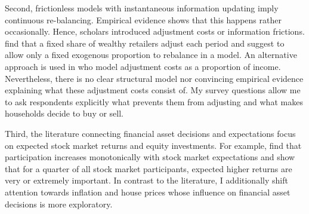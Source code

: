 \documentclass[ProjectABM]{subfiles}
\begin{document}
Second, frictionless models with instantaneous information updating imply continuous re-balancing. Empirical evidence shows that this happens rather occasionally. Hence, scholars introduced adjustment costs or information frictions. \cite{giglio_et_al_2019five} find that a fixed share of wealthy retailers adjust each period and suggest to allow only a fixed exogenous proportion to rebalance in a model. An alternative approach is used in \cite{bonaparte_et_al_2012adjustment} who model adjustment costs as a proportion of income. 
Nevertheless, there is no clear structural model nor convincing empirical evidence explaining what these adjustment costs consist of. My survey questions allow me to ask respondents explicitly what prevents them from adjusting and what makes households decide to buy or sell.

Third, the literature connecting financial asset decisions and expectations focus on expected stock market returns and equity investments. For example, \cite{arrondel_et_al_2014subjective_return_expectation} find that participation increases monotonically with stock market expectations and \cite{choi_2020} show that for a quarter of all stock market participants, expected higher returns are very or extremely important. %
In contrast to the literature, I additionally shift attention towards inflation and house prices whose influence on financial asset decisions is more exploratory. %

\end{document}
